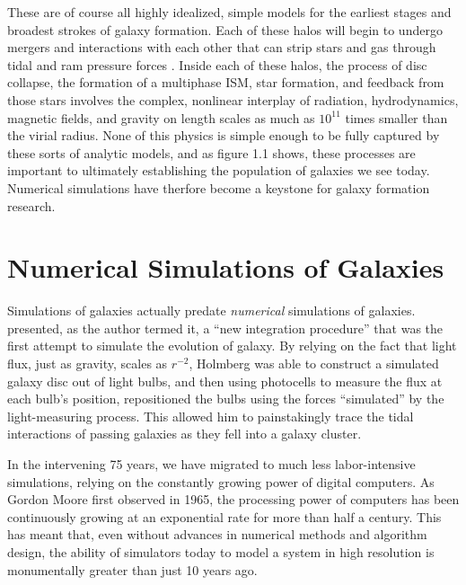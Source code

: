 These are of course all highly idealized, simple models for the earliest stages
and broadest strokes of galaxy formation.  Each of these halos will begin to
undergo mergers and interactions \citet{Navarro1993,Kaufmann1999,Cole2000} with
each other that can strip stars and gas through tidal and ram pressure forces
\citep{Gunn1972,Dressler1980}.  Inside each of these halos, the process of disc
collapse, the formation of a multiphase ISM, star formation, and feedback from
those stars involves the complex, nonlinear interplay of radiation,
hydrodynamics, magnetic fields, and gravity on length scales as much as
$10^{11}$ times smaller than the virial radius.  None of this physics is simple
enough to be fully captured by these sorts of analytic models, and as figure 1.1
shows, these processes are important to ultimately establishing the population
of galaxies we see today.  Numerical simulations have therfore become a keystone for
galaxy formation research.


\section{Numerical Simulations of Galaxies}
Simulations of galaxies actually predate {\it numerical} simulations of
galaxies.  \citet{Holmberg1941} presented, as the author termed it, a ``new
integration procedure'' that was the first attempt to simulate the
evolution of galaxy.  By relying on the fact that light flux, just as gravity,
scales as $r^{-2}$, Holmberg was able to construct a simulated galaxy disc out
of light bulbs, and then using photocells to measure the flux at each bulb's
position, repositioned the bulbs using the forces ``simulated'' by the
light-measuring process.  This allowed him to painstakingly trace the tidal
interactions of passing galaxies as they fell into a galaxy cluster.

In the intervening 75 years, we have migrated to much less labor-intensive
simulations, relying on the constantly growing power of digital computers.  As
Gordon Moore first observed in 1965, the processing power of computers has been
continuously growing at an exponential rate for more than half a century.  This
has meant that, even without advances in numerical methods and algorithm design,
the ability of simulators today to model a system in high resolution is
monumentally greater than just 10 years ago.  


